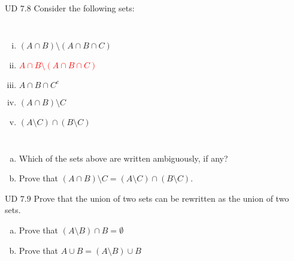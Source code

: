 \begin{frame}{}
  \begin{exampleblock}{UD $7.8$}
    Consider the following sets:
    \begin{columns}
	\begin{enumerate}[(i)]
	  \item $(A \cap B) \setminus (A \cap B \cap C)$
	  \item \textcolor<2->{red}{$A \cap B \setminus (A \cap B \cap C)$}
	  \item $A \cap B \cap C^{c}$
	  \item $(A \cap B) \setminus C$
	  \item $(A \setminus C) \cap (B \setminus C)$
	\end{enumerate}
    \end{columns}

    \vspace{0.30cm}
    \begin{enumerate}[(a)]
      \item Which of the sets above are written ambiguously, if any?
      \setcounter{enumi}{2}
      \item Prove that $(A \cap B) \setminus C = (A \setminus C) \cap (B \setminus C)$.
    \end{enumerate}
  \end{exampleblock}


  \vspace{-0.60cm}
\end{frame}

\begin{frame}{}
  \begin{exampleblock}{UD $7.9$}
    Prove that the union of two sets can be rewritten as the union of two  sets.
    \begin{enumerate}[(a)]
      \item Prove that $(A \setminus B) \cap B = \emptyset$
      \item Prove that $A \cup B = (A \setminus B) \cup B$
    \end{enumerate}
  \end{exampleblock}

  \vspace{0.30cm}
  \begin{columns}
      \pause
  \end{columns}
\end{frame}


